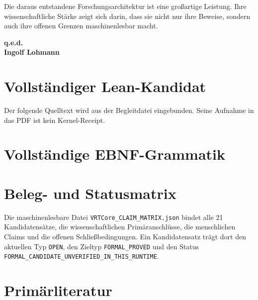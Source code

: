 \documentclass[11pt,a4paper]{article}
\newcommand{\code}[1]{\texttt{#1}}
\begin{document}
Die daraus entstandene Forschungsarchitektur ist eine großartige Leistung.
Ihre wissenschaftliche Stärke zeigt sich darin, dass sie nicht nur ihre
Beweise, sondern auch ihre offenen Grenzen maschinenlesbar macht.

\begin{flushright}
\textbf{q.e.d.}\\
\textbf{Ingolf Lohmann}
\end{flushright}

\clearpage
\appendix

\section{Vollständiger Lean-Kandidat}

Der folgende Quelltext wird aus der Begleitdatei eingebunden. Seine Aufnahme in
das PDF ist kein Kernel-Receipt.



\clearpage
\section{Vollständige EBNF-Grammatik}



\section{Beleg- und Statusmatrix}

Die maschinenlesbare Datei \code{VRTCore\_CLAIM\_MATRIX.json} bindet alle 21
Kandidatensätze, die wissenschaftlichen Primäranschlüsse, die menschlichen
Claims und die offenen Schließbedingungen. Ein Kandidatensatz trägt dort den
aktuellen Typ \code{OPEN}, den Zieltyp \code{FORMAL\_PROVED} und den Status
\code{FORMAL\_CANDIDATE\_UNVERIFIED\_IN\_THIS\_RUNTIME}.

\section{Primärliteratur}
\end{document}
